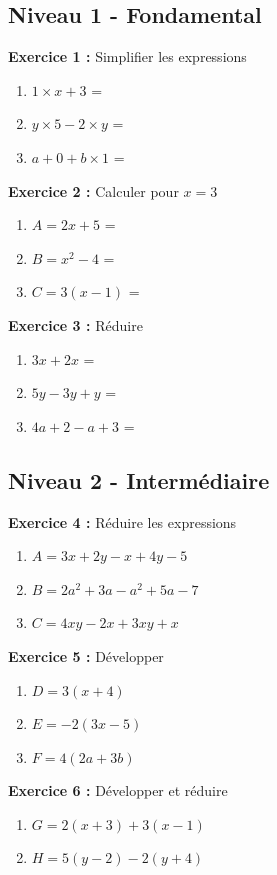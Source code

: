 \subsection{Niveau 1 - Fondamental}

\begin{exercisebox}
	\textbf{Exercice 1 :} Simplifier les expressions
	\begin{enumerate}[label=\alph*)]
		\item $1 \times x + 3$ = \trous{3cm}
		\item $y \times 5 - 2 \times y$ = \trous{3cm}
		\item $a + 0 + b \times 1$ = \trous{3cm}
	\end{enumerate}
	
	\textbf{Exercice 2 :} Calculer pour $x = 3$
	\begin{enumerate}[label=\alph*)]
		\item $A = 2x + 5$ = \trous{3cm}
		\item $B = x^2 - 4$ = \trous{3cm}
		\item $C = 3(x - 1)$ = \trous{3cm}
	\end{enumerate}
	
	\textbf{Exercice 3 :} Réduire
	\begin{enumerate}[label=\alph*)]
		\item $3x + 2x$ = \trous{3cm}
		\item $5y - 3y + y$ = \trous{3cm}
		\item $4a + 2 - a + 3$ = \trous{3cm}
	\end{enumerate}
\end{exercisebox}

\subsection{Niveau 2 - Intermédiaire}

\begin{exercisebox}
	\textbf{Exercice 4 :} Réduire les expressions
	\begin{enumerate}[label=\alph*)]
		\item $A = 3x + 2y - x + 4y - 5$
		\item $B = 2a^2 + 3a - a^2 + 5a - 7$
		\item $C = 4xy - 2x + 3xy + x$
	\end{enumerate}
	
	\textbf{Exercice 5 :} Développer
	\begin{enumerate}[label=\alph*)]
		\item $D = 3(x + 4)$
		\item $E = -2(3x - 5)$
		\item $F = 4(2a + 3b)$
	\end{enumerate}
	
	\textbf{Exercice 6 :} Développer et réduire
	\begin{enumerate}[label=\alph*)]
		\item $G = 2(x + 3) + 3(x - 1)$
		\item $H = 5(y - 2) - 2(y + 4)$
	\end{enumerate}
\end{exercisebox}

